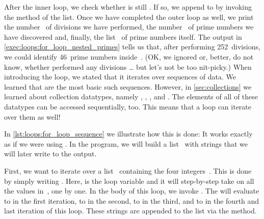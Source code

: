 After the inner loop, we check whether  is still .
If so, we append  to  by invoking the  method of the list.
Once we have completed the outer loop as well, we print the number~ of divisions we have performed, the number~ of prime numbers we have discovered and, finally, the list~ of prime numbers itself.
The output in \cref{exec:loops:for_loop_nested_primes} tells us that, after performing 252~divisions, we could identify 46~prime numbers inside~.
(OK, we ignored or, better, do not know, whether  performed any divisions {\dots} but let's not be too nit-picky.)%
%
\FloatBarrier%
\endhsection%
%
%
\label{sec:loopsOverSequences}%
%
%
%
%
When introducing the  loop, we stated that it iterates over sequences of data.
We learned that  are the most basic such sequences.
However, in \cref{sec:collections} we learned about collection datatypes, namely , , , and .
The elements of all of these datatypes can be accessed sequentially, too.
This means that a  loop can iterate over them as well!

In \cref{lst:loops:for_loop_sequence} we illustrate how this is done:
It works exactly as if we were using .
In the program, we will build a list~ with strings that we will later write to the output.

First, we want to iterate over a list~ containing the four integers~\pythonil{[1, 2, 3, 50]}.
This is done by simply writing .
Here,  is the loop variable and it will step-by-step take on all the values in~, one by one.
In the body of this loop, we invoke .
The  will evaluate to  in the first iteration, to  in the second, to  in the third, and to  in the fourth and last iteration of this loop.
These strings are appended to the list  via the  method.

